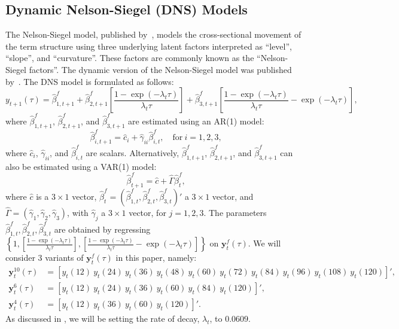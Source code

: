 \subsection{Dynamic Nelson-Siegel (DNS) Models}
\label{sec:dns}
The Nelson-Siegel model, published by~\textcite{Nelson1987}, models the cross-sectional movement of the term structure using three underlying latent factors interpreted as \enquote{level}, \enquote{slope}, and \enquote{curvature}. 
These factors are commonly known as the \enquote{Nelson-Siegel factors}. 
The dynamic version of the Nelson-Siegel model was published by~\textcite[hereafter DNS]{Diebold2006}. 
The DNS model is formulated as follows:
\begin{equation}
	y_{t+1}(\tau) = \hat{\beta}_{1,t+1}^{f} + \hat{\beta}_{2,t+1}^{f} \left[\frac{1-\exp(-\lambda_t \tau)}{\lambda_t \tau}\right] + \hat{\beta}_{3,t+1}^{f} \left[\frac{1-\exp(-\lambda_t \tau)}{\lambda_t \tau} - \exp(-\lambda_t \tau)\right],
\end{equation}
where $\hat{\beta}_{1,t+1}^{f}$, $\hat{\beta}_{2,t+1}^{f}$, and $\hat{\beta}_{3,t+1}^{f}$ are estimated using an AR(1) model:
\begin{equation}
\label{eq:dnsar}
	\hat{\beta}_{i,t+1}^{f} = \hat{c}_i + \hat{\gamma}_{ii} \hat{\beta}_{i,t}^f, \quad \text{for}~i = 1,2,3,
\end{equation}
where $\hat{c}_i$, $\hat{\gamma}_{ii}$, and $\hat{\beta}_{i,t}^f$ are scalars. 
Alternatively, $\hat{\beta}_{1,t+1}^{f}$, $\hat{\beta}_{2,t+1}^{f}$, and $\hat{\beta}_{3,t+1}^{f}$ can also be estimated using a VAR(1) model:
\begin{equation}
\label{eq:dnsvar}
	\hat{\beta}_{t+1}^{f} = \hat{c} + \hat{\Gamma} \hat{\beta}_t^f,
\end{equation}
where $\hat{c}$ is a $3 \times 1$ vector, $\hat{\beta}_t^f = \left(\hat{\beta}_{1,t}^f, \hat{\beta}_{2,t}^f, \hat{\beta}_{3,t}^f\right)'$ a $3 \times 1$ vector, and $\hat{\Gamma} = \left(\hat{\gamma}_1, \hat{\gamma}_2, \hat{\gamma}_3 \right)$, with $\hat{\gamma}_j$ a $3 \times 1$ vector, for $j = 1,2,3$. 
The parameters $\hat{\beta}_{1,t}^f, \hat{\beta}_{2,t}^f, \hat{\beta}_{3,t}^f$ are obtained by regressing $\left\{1, \left[\frac{1-\exp(-\lambda_t \tau)}{\lambda_t \tau}\right], \left[\frac{1-\exp(-\lambda_t \tau)}{\lambda_t \tau} - \exp(-\lambda_t \tau)\right] \right\}$ on $\mathbf{y}_t^f(\tau)$. 
We will consider 3 variants of $\mathbf{y}_t^f(\tau)$ in this paper, namely:
\begin{align*}
	\mathbf{y}_t^{10}(\tau) &= \left[y_t(12)~y_t(24)~y_t(36)~y_t(48)~y_t(60)~y_t(72)~y_t(84)~y_t(96)~y_t(108)~y_t(120) \right]', \\
	\mathbf{y}_t^6(\tau) &= \left[y_t(12)~y_t(24)~y_t(36)~y_t(60)~y_t(84)~y_t(120) \right]', \\
	\mathbf{y}_t^4(\tau) &= \left[y_t(12)~y_t(36)~y_t(60)~y_t(120) \right]'.
\end{align*}
As discussed in \textcite{Diebold2006}, we will be setting the rate of decay, $\lambda_t$, to $0.0609$.

